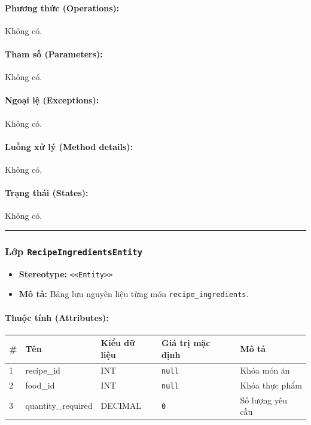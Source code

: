 \documentclass[12pt,a4paper]{article}
\begin{document}
\paragraph{Phương thức (Operations):}
Không có.

\paragraph{Tham số (Parameters):}
Không có.

\paragraph{Ngoại lệ (Exceptions):}
Không có.

\paragraph{Luồng xử lý (Method details):}
Không có.

\paragraph{Trạng thái (States):}
Không có.

\vskip 0.5cm
\noindent\rule{\textwidth}{0.5pt}
\vskip 0.5cm

\subsubsection{Lớp \texttt{RecipeIngredientsEntity}}

\begin{itemize}[leftmargin=*]
    \item \textbf{Stereotype:} \texttt{\textless{}\textless{}Entity\textgreater{}\textgreater{}}
    \item \textbf{Mô tả:} Bảng lưu nguyên liệu từng món \texttt{recipe\_ingredients}.
\end{itemize}

\paragraph{Thuộc tính (Attributes):}
\begin{longtable}{|p{0.6cm}|p{3.5cm}|p{2.4cm}|p{1.8cm}|p{5.1cm}|}
\hline
\textbf{\#} & \textbf{Tên} & \textbf{Kiểu dữ liệu} & \textbf{Giá trị mặc định} & \textbf{Mô tả} \\ \hline
\endhead
1 & recipe\_id & INT & \texttt{null} & Khóa món ăn \\ \hline
2 & food\_id & INT & \texttt{null} & Khóa thực phẩm \\ \hline
3 & quantity\_required & DECIMAL & \texttt{0} & Số lượng yêu cầu \\ \hline
\end{longtable}
\end{document}
